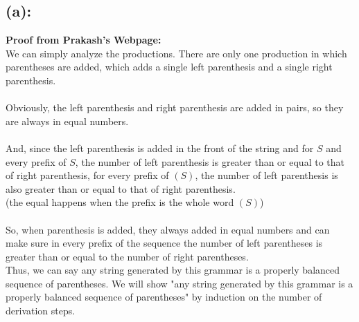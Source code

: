 \documentclass [9 pt]{article}
\theoremstyle{definition}
\begin{document}
\subsection*{(a):}
\textbf{Proof from Prakash's Webpage:}\\
We can simply analyze the productions. There are only one production in which parentheses are added, which adds a single left parenthesis and a single right parenthesis.\\
\\
 Obviously, the left parenthesis and right parenthesis are added in pairs, so they are always in equal numbers.\\
 \\
  And, since the left parenthesis is added in the front of the string and for $S$ and every prefix of $S$, the number of left parenthesis is greater than or equal to that of right parenthesis,
  for every prefix of $(S)$, the number of left parenthesis is also greater than or equal to that of right parenthesis.\\
  \bigg(the equal happens when the prefix is the whole word $(S)$\bigg)\\
  \\
  So, when parenthesis is added, they always added in equal numbers and can make sure in every prefix of the sequence the number of left parentheses is greater than or equal to the number of right parentheses.\\
  Thus, we can say any string generated by this grammar is a properly balanced sequence of parentheses.
\newpage
We will show "any string generated by this grammar is a properly balanced sequence of parentheses" by induction on the number of derivation steps.
\end{document}
